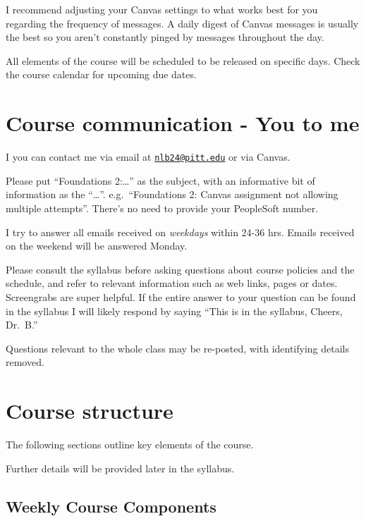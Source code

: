 \documentclass[
]{book}
\begin{document}
I recommend adjusting your Canvas settings to what works best for you regarding the frequency of messages. A daily digest of Canvas messages is usually the best so you aren't constantly pinged by messages throughout the day.

All elements of the course will be scheduled to be released on specific days. Check the course calendar for upcoming due dates.

\hypertarget{communication-u2me}{%
\chapter{Course communication - You to me}\label{communication-u2me}}

I you can contact me via email at \href{mailto:nlb24@pitt.edu}{\nolinkurl{nlb24@pitt.edu}} or via Canvas.

Please put ``Foundations 2:\ldots{}'' as the subject, with an informative bit of information as the ``\ldots{}''. e.g.~``Foundations 2: Canvas assignment not allowing multiple attempts''. There's no need to provide your PeopleSoft number.

I try to answer all emails received on \emph{weekdays} within 24-36 hrs. Emails received on the weekend will be answered Monday.

Please consult the syllabus before asking questions about course policies and the schedule, and refer to relevant information such as web links, pages or dates. Screengrabs are super helpful. If the entire answer to your question can be found in the syllabus I will likely respond by saying ``This is in the syllabus, Cheers, Dr.~B.''

Questions relevant to the whole class may be re-posted, with identifying details removed.

\hypertarget{course-structure}{%
\chapter{Course structure}\label{course-structure}}

The following sections outline key elements of the course.

Further details will be provided later in the syllabus.

\hypertarget{weekly-course-components}{%
\section{Weekly Course Components}\label{weekly-course-components}}
\end{document}
